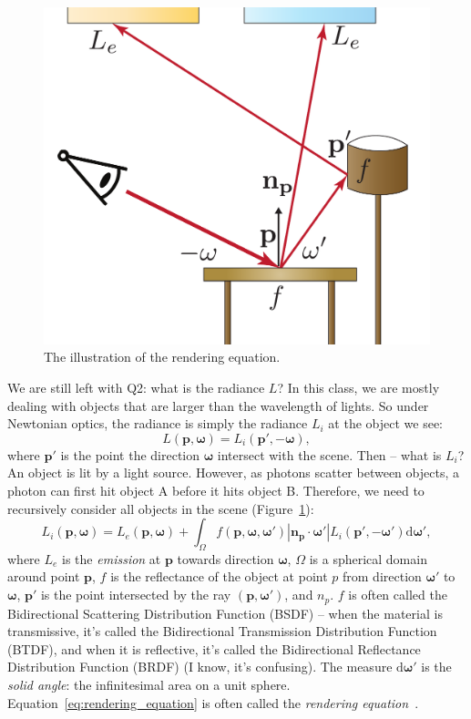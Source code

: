 \begin{figure}[h]
    \centering
    \includegraphics[width=0.4\linewidth]{imgs/pathtracing.pdf}
    \caption{The illustration of the rendering equation.}
    \label{fig:pathtracing}
\end{figure}

We are still left with Q2: what is the radiance $L$? In this class, we are mostly dealing with objects that are larger than the wavelength of lights. So under Newtonian optics, the radiance is simply the radiance $L_i$ at the object we see:
\begin{equation}
    L(\mathbf{p}, \mathbf{\omega}) = L_i(\mathbf{p}', -\mathbf{\omega}),
\end{equation}
where $\mathbf{p}'$ is the point the direction $\mathbf{\omega}$ intersect with the scene. Then -- what is $L_i$? An object is lit by a light source. However, as photons scatter between objects, a photon can first hit object A before it hits object B. Therefore, we need to recursively consider all objects in the scene (Figure~\ref{fig:pathtracing}):
\begin{equation}
    L_i(\mathbf{p}, \mathbf{\omega}) = L_e(\mathbf{p}, \mathbf{\omega}) + \int_{\Omega} f(\mathbf{p}, \mathbf{\omega}, \mathbf{\omega}') |\mathbf{n}_{\mathbf{p}} \cdot \mathbf{\omega}'| L_i(\mathbf{p}', -\mathbf{\omega}') \mathrm{d} \mathbf{\omega}',
    \label{eq:rendering_equation}
\end{equation}
where $L_e$ is the \emph{emission} at $\mathbf{p}$ towards direction $\mathbf{\omega}$, $\Omega$ is a spherical domain around point $\mathbf{p}$, $f$ is the reflectance of the object at point $p$ from direction $\mathbf{\omega}'$ to $\mathbf{\omega}$, $\mathbf{p}'$ is the point intersected by the ray $(\mathbf{p}, \mathbf{\omega}')$, and $n_{p}$. $f$ is often called the Bidirectional Scattering Distribution Function (BSDF) -- when the material is transmissive, it's called the Bidirectional Transmission Distribution Function (BTDF), and when it is reflective, it's called the Bidirectional Reflectance Distribution Function (BRDF) (I know, it's confusing). The measure $\mathrm{d} \mathbf{\omega}'$ is the \emph{solid angle}: the infinitesimal area on a unit sphere. Equation~\ref{eq:rendering_equation} is often called the \emph{rendering equation}~\cite{Kajiya:1986:RE}.

